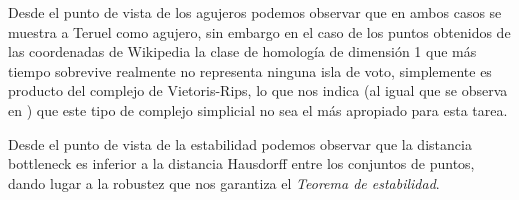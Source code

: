 Desde el punto de vista de los agujeros podemos observar que en ambos casos se muestra a Teruel como agujero, sin embargo en el caso de los puntos obtenidos de las coordenadas de Wikipedia la clase de homología de dimensión 1 que más tiempo sobrevive realmente no representa ninguna isla de voto, simplemente es producto del complejo de Vietoris-Rips, lo que nos indica (al igual que se observa en \cite{votosArticulo}) que este tipo de complejo simplicial no sea el más apropiado para esta tarea.

Desde el punto de vista de la estabilidad podemos observar que la distancia bottleneck es inferior a la distancia Hausdorff entre los conjuntos de puntos, dando lugar a la robustez que nos garantiza el \emph{Teorema de estabilidad}.

\begin{minipage}{\linewidth}
\end{minipage}